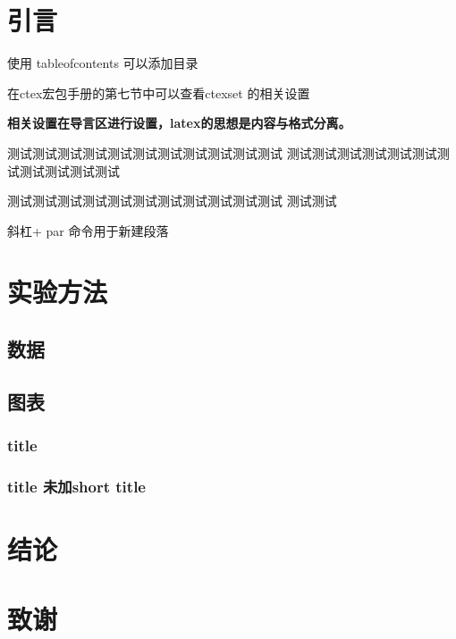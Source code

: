 \documentclass[UTF8]{ctexart}
\date{\today}
\begin{document}
	\tableofcontents
	\section{引言}
	使用 tableofcontents 可以添加目录
	
	在ctex宏包手册的第七节中可以查看ctexset 的相关设置
	
	\textbf{相关设置在导言区进行设置，latex的思想是内容与格式分离。} 
	
	测试测试测试测试测试测试测试测试测试测试测试
	测试测试测试测试测试测试测试测试测试测试测试
	
	测试测试测试测试测试测试测试测试测试测试测试
	测试测试 \par  斜杠+ par 命令用于新建段落
	
	\section{实验方法}
	\subsection{数据}
	\subsection{图表}
	\subsubsection[short title]{title}
	\subsubsection{title    未加short title}
	\section{结论}
	\section{致谢}
\end{document}
